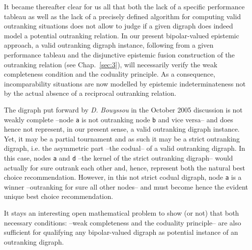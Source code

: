 It became thereafter clear for us all that both the lack of a specific performance tableau as well as the lack of a precisely defined algorithm for computing valid outranking situations does not allow to judge if a given digraph does indeed model a potential outranking relation. In our present bipolar-valued epistemic approach, a valid outranking digraph instance, following from a given performance tableau and the disjunctive epistemic fusion construction of the outranking relation (see Chap.~\ref{sec:3}), will necessarily verify the weak completeness condition and the coduality principle. As a consequence, incomparability situations are now modelled by epistemic indeterminateness not by the actual absence of a reciprocal outranking relation.

The digraph put forward by \emph{D. Bouyssou} in the October 2005 discussion is not weakly complete --node \texttt{a} is not outranking node \texttt{b} and vice versa-- and does hence not represent, in our present sense, a valid outranking digraph instance. Yet, it may be a partial tournament and as such it may be a strict outranking digraph, i.e. the asymmetric part --the codual-- of a valid outranking digraph. In this case, nodes \texttt{a} and \texttt{d} --the kernel of the strict outranking digraph-- would actually for sure outrank each other and, hence, represent both the natural best choice recommendation. However, in this not strict codual digraph, node \texttt{a} is a \Condorcet winner --outranking for sure all other nodes-- and must become hence the evident unique best choice recommendation.

It stays an interesting open mathematical problem to show (or not) that both necessary conditions: --weak completeness and the coduality principle-- are also sufficient for qualifying any bipolar-valued digraph as potential instance of an outranking digraph.


%


